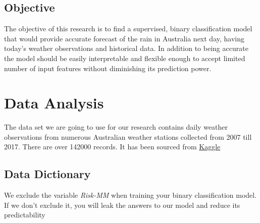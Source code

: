 \hypertarget{objective}{%
\subsection{Objective}\label{objective}}

The objective of this research is to find a supervised, binary
classification model that would provide accurate forecast of the rain in
Australia next day, having today's weather observations and historical
data. In addition to being accurate the model should be easily
interpretable and flexible enough to accept limited number of input
features without diminishing its prediction power.

\hypertarget{data-analysis}{%
\section{Data Analysis}\label{data-analysis}}

The data set we are going to use for our research contains daily weather
observations from numerous Australian weather stations collected from
2007 till 2017. There are over 142000 records. It has been sourced from
\href{https://www.kaggle.com/jsphyg/weather-dataset-rattle-package}{Kaggle}

\hypertarget{data-dictionary}{%
\subsection{Data Dictionary}\label{data-dictionary}}

We exclude the variable \emph{Risk-MM} when training your binary
classification model. If we don't exclude it, you will leak the answers
to our model and reduce its predictability

